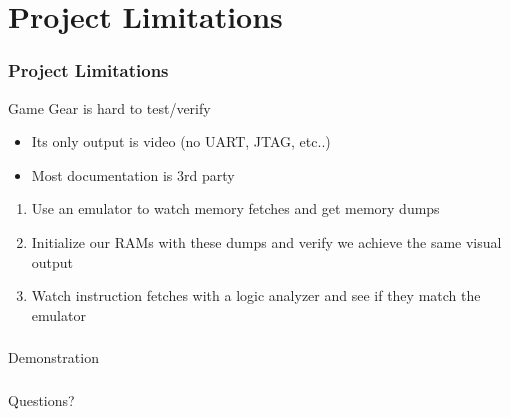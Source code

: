\documentclass[xcolor=table]{beamer}
\newlength{\wideitemsep}
\let\olditem\item
\renewcommand{\item}{\setlength{\itemsep}{\wideitemsep}\olditem}
\begin{document}
\section{Project Limitations}
\begin{frame}
    \frametitle{Project Limitations}
    Game Gear is hard to test/verify
    \begin{itemize}
            \olditem<2-> Its only output is video (no UART, JTAG, etc..)
            \olditem<3-> Most documentation is 3rd party
    \end{itemize}
    \vspace{0.25cm}
    \begin{enumerate}
            \olditem<5-> Use an emulator to watch memory fetches and get memory dumps
            \olditem<6-> Initialize our RAMs with these dumps and verify we achieve the same visual output
            \olditem<7-> Watch instruction fetches with a logic analyzer and see if they match the emulator
    \end{enumerate}
    \vspace{0.25cm}
\end{frame}

\begin{frame}
    \frametitle{}
    \begin{center}
        \Huge
        Demonstration
    \end{center}
\end{frame}

\begin{frame}
    \frametitle{}
    \begin{center}
        \Huge
        Questions?
    \end{center}
\end{frame}

\newpage
\end{document}
